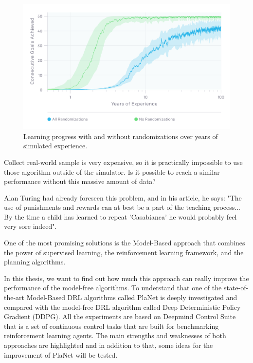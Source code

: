 \begin{figure}[H]
\centering
\includegraphics[width=1.\textwidth, height=.3\textheight]{pictures/years_robot_hand}
\caption{ Learning progress with and without randomizations over years of simulated experience.}
            \end{figure}

Collect real-world sample is very expensive, so it is practically impossible to use those algorithm outside of the simulator.
Is it possible to reach a similar performance without this massive amount of data?

Alan Turing had already foreseen this problem, and in his article, he says: "The use of punishments and rewards can at best be a part of the teaching process... By the time a child has learned to repeat 'Casabianca' he would probably feel very sore indeed".

One of the most promising solutions is the Model-Based approach that combines the power of supervised learning, the reinforcement learning framework, and the planning algorithms.

In this thesis, we want to find out how much this approach can really improve the performance of the model-free algorithms. To understand that one of the state-of-the-art Model-Based DRL algorithms called PlaNet is deeply investigated and compared with the model-free DRL algorithm called Deep Deterministic Policy Gradient (DDPG).
All the experiments are based on Deepmind Control Suite that is a set of continuous control tasks that are built for benchmarking reinforcement learning agents.  The main strengths and weaknesses of both approaches are highlighted and in addition to that, some ideas for the improvement of PlaNet will be tested.





